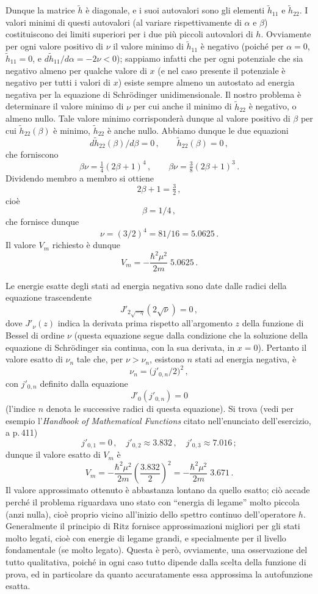 \documentclass[11pt, a4paper]{book}
\numberwithin{equation}{section}
\begin{document}
\begin{description}
Dunque la matrice $\tilde{h}$ è diagonale, e i suoi autovalori sono gli elementi $\tilde{h}_{11}$ e $\tilde{h}_{22}$. I valori minimi di questi autovalori (al variare rispettivamente di $\alpha$ e $\beta$) costituiscono dei limiti superiori per i due più piccoli autovalori di $h$. Ovviamente per ogni valore positivo di $\nu$ il valore minimo di $\tilde{h}_{11}$ è negativo (poiché per $\alpha=0$, $\tilde{h}_{11}=0$, e $d\tilde{h}_{11}/d\alpha = -2\nu < 0$); sappiamo infatti che per ogni potenziale che sia negativo almeno per qualche valore di $x$ (e nel caso presente il potenziale è negativo per tutti i valori di $x$) esiste sempre almeno un autostato ad energia negativa per la equazione di Schrödinger unidimensionale. Il nostro problema è determinare il valore minimo di $\nu$ per cui anche il minimo di $\tilde{h}_{22}$ è negativo, o almeno nullo. Tale valore minimo corrisponderà dunque al valore positivo di $\beta$ per cui $\tilde{h}_{22}(\beta)$ è minimo, $\tilde{h}_{22}$ è anche nullo. Abbiamo dunque le due equazioni
\[
  d\tilde{h}_{22}(\beta)/d\beta = 0\,,\qquad
  \tilde{h}_{22}(\beta) = 0\,,
\]
che forniscono
\[
  \beta\nu = \tfrac{1}{4}(2\beta+1)^4\,,\qquad
  \beta\nu = \tfrac{3}{8}(2\beta+1)^3\,.
\]
Dividendo membro a membro si ottiene
\[
  2\beta+1 = \tfrac{3}{2}\,,
\]
cioè
\[
  \beta = 1/4\,,
\]
che fornisce dunque
\[
  \nu = (3/2)^4 = 81/16 = 5.0625\,.
\]
Il valore $V_m$ richiesto è dunque
\[
  V_m = -\frac{\hbar^2\mu^2}{2m}\;5.0625\,.
\]

Le energie esatte degli stati ad energia negativa sono date dalle radici della equazione trascendente
\[
  J'_{2\sqrt{-\eta}}\!\left(2\sqrt{\nu}\right) = 0\,,
\]
dove $J'_\nu(z)$ indica la derivata prima rispetto all'argomento $z$ della funzione di Bessel di ordine $\nu$ (questa equazione segue dalla condizione che la soluzione della equazione di Schrödinger sia continua, con la sua derivata, in $x=0$). Pertanto il valore esatto di $\nu_n$ tale che, per $\nu>\nu_n$, esistono $n$ stati ad energia negativa, è
\[
  \nu_n = \bigl(j'_{0,n}/2\bigr)^2\,,
\]
con $j'_{0,n}$ definito dalla equazione
\[
  J'_0\!\left(j'_{0,n}\right) = 0
\]
(l'indice $n$ denota le successive radici di questa equazione). Si trova (vedi per esempio l'\textit{Handbook of Mathematical Functions} citato nell'enunciato dell'esercizio, a p.\,411)
\[
  j'_{0,1} = 0\,,\quad j'_{0,2} \approx 3.832\,,\quad j'_{0,3} \approx 7.016\,;
\]
dunque il valore esatto di $V_m$ è
\[
  V_m = -\frac{\hbar^2\mu^2}{2m}\left(\frac{3.832}{2}\right)^2
  = -\frac{\hbar^2\mu^2}{2m}\;3.671\,.
\]
Il valore approssimato ottenuto è abbastanza lontano da quello esatto; ciò accade perché il problema riguardava uno stato con ``energia di legame'' molto piccola (anzi nulla), cioè proprio vicino all'inizio dello spettro continuo dell'operatore $h$. Generalmente il principio di Ritz fornisce approssimazioni migliori per gli stati molto legati, cioè con energie di legame grandi, e specialmente per il livello fondamentale (se molto legato). Questa è però, ovviamente, una osservazione del tutto qualitativa, poiché in ogni caso tutto dipende dalla scelta della funzione di prova, ed in particolare da quanto accuratamente essa approssima la autofunzione esatta.

\end{description}
\end{document}
